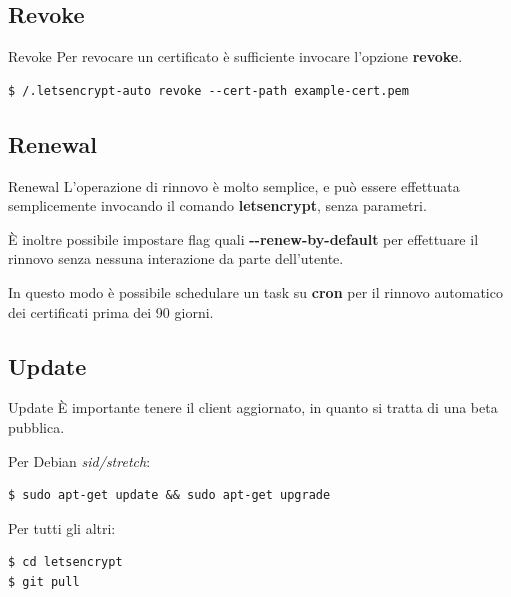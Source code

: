 \documentclass[xcolor=svgnames,11pt]{beamer}
\begin{document}
\subsection{Revoke}
\begin{frame}[fragile]{Revoke}
Per revocare un certificato è sufficiente invocare l'opzione \textbf{revoke}.

\medskip\pause

\begin{scriptsize}
\begin{verbatim}
$ /.letsencrypt-auto revoke --cert-path example-cert.pem
\end{verbatim}
\end{scriptsize}
\end{frame}

\subsection{Renewal}
\begin{frame}[fragile]{Renewal}
L'operazione di rinnovo è molto semplice, e può essere effettuata semplicemente
invocando il comando \textbf{letsencrypt}, senza parametri.

\medskip\pause

È inoltre possibile impostare flag quali \textbf{-{}-renew-by-default} per effettuare
il rinnovo senza nessuna interazione da parte dell'utente.

\medskip\pause

In questo modo è possibile schedulare un task su \textbf{cron} per il rinnovo
automatico dei certificati prima dei 90 giorni.

\end{frame}

\subsection{Update}
\begin{frame}[fragile]{Update}
È importante tenere il client aggiornato, in quanto si tratta di una beta pubblica.


\medskip\pause
Per Debian \emph{sid/stretch}:
\begin{block}{}
\begin{scriptsize}
\begin{verbatim}
$ sudo apt-get update && sudo apt-get upgrade
\end{verbatim}
\end{scriptsize}
\end{block}

\medskip\pause
Per tutti gli altri:
\begin{block}{}
\begin{scriptsize}
\begin{verbatim}
$ cd letsencrypt
$ git pull
\end{verbatim}
\end{scriptsize}
\end{block}

\end{frame}
\end{document}

